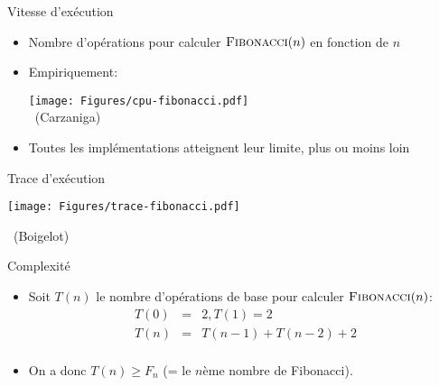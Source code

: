 \begin{frame}{Vitesse d'exécution}
\begin{itemize}
\item Nombre d'opérations pour calculer $\textnormal{\scshape Fibonacci}(n)$ en fonction de $n$
\item Empiriquement:

\begin{center}
\texttt{[image: Figures/cpu-fibonacci.pdf]}\\
~\hfill\scriptsize(Carzaniga)
\end{center}

\item Toutes les implémentations atteignent leur limite, plus ou moins loin
\end{itemize}
\end{frame}

\begin{frame}{Trace d'exécution}
\centerline{\texttt{[image: Figures/trace-fibonacci.pdf]}}
~\hfill\scriptsize(Boigelot)
\end{frame}

\begin{frame}{Complexité}
\begin{center}
\end{center}

\bigskip

\begin{itemize}
\item Soit $T(n)$ le nombre d'opérations de base pour calculer $\textnormal{\scshape Fibonacci}(n)$:
\begin{eqnarray*}
T(0) & = & 2, T(1)=2\\
T(n) & = & T(n-1)+T(n-2)+2\\
\end{eqnarray*}
\item On a donc $T(n)\geq F_n$ (= le $n$ème nombre de Fibonacci).
\end{itemize}

\end{frame}

